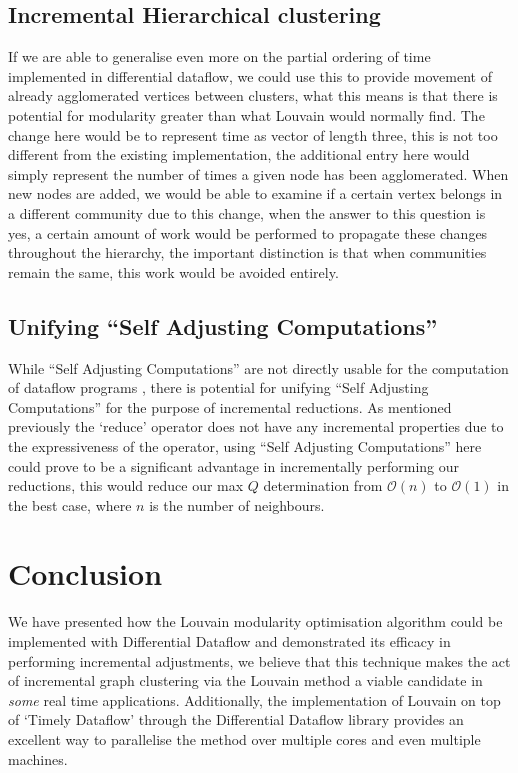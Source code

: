 \subsection{Incremental Hierarchical clustering}
\label{section:incr_hier_clustering}
If we are able to generalise even more on the partial ordering of time implemented in differential dataflow, we could use this to provide movement of already agglomerated vertices between clusters, what this means is that there is potential for modularity greater than what Louvain would normally find. The change here would be to represent time as vector of length three, this is not too different from the existing implementation, the additional entry here would simply represent the number of times a given node has been agglomerated. When new nodes are added, we would be able to examine if a certain vertex belongs in a different community due to this change, when the answer to this question is yes, a certain amount of work would be performed to propagate these changes throughout the hierarchy, the important distinction is that when communities remain the same, this work would be avoided entirely. 

\subsection{Unifying ``Self Adjusting Computations''}
While ``Self Adjusting Computations'' are not directly usable for the computation of dataflow programs \cite{mcsherry2013differential}, there is potential for unifying ``Self Adjusting Computations'' for the purpose of incremental reductions. As mentioned previously the `reduce' operator does not have any incremental properties due to the expressiveness of the operator, using ``Self Adjusting Computations'' here could prove to be a significant advantage in incrementally performing our reductions, this would reduce our max $Q$ determination from $\mathcal{O}(n)$ to $\mathcal{O}(1)$ in the best case, where $n$ is the number of neighbours. 

\section{Conclusion}
We have presented how the Louvain modularity optimisation algorithm could be implemented with Differential Dataflow and demonstrated its efficacy in performing incremental adjustments, we believe that this technique makes the act of incremental graph clustering via the Louvain method a viable candidate in \textit{some} real time applications. Additionally, the implementation of Louvain on top of `Timely Dataflow' through the Differential Dataflow library provides an excellent way to parallelise the method over multiple cores and even multiple machines. 